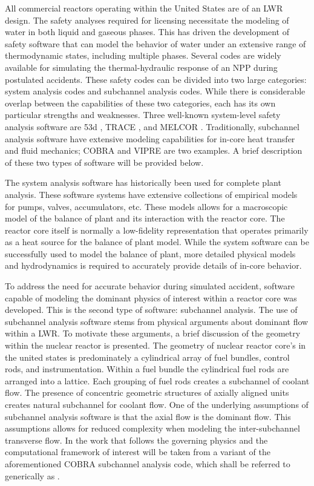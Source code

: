 All commercial reactors operating within the United States are of an LWR design.
The safety analyses required for licensing necessitate the modeling of water in both liquid and gaseous phases.
This has driven the development of safety software that can model the behavior of water under an extensive range of thermodynamic states, including multiple phases.
Several codes are widely available for simulating the thermal-hydraulic response of an NPP during postulated accidents.
These safety codes can be divided into two large categories: system analysis codes and subchannel analysis codes.
While there is considerable overlap between the capabilities of these two categories, each has its own particular strengths and weaknesses.
Three well-known system-level safety analysis software are \relap53d{} \cite{RELAP}, TRACE \cite{TRACE}, and MELCOR \cite{Summers1994}.
Traditionally, subchannel analysis software have extensive modeling capabilities for in-core heat transfer and fluid mechanics; COBRA \cite{Thurgood1983c} and VIPRE are two examples.
A brief description of these two types of software will be provided below.

The system analysis software has historically been used for complete plant analysis.
These software systems have extensive collections of empirical models for pumps, valves, accumulators, etc.
These models allows for a macroscopic model of the balance of plant and its interaction with the
reactor core.
The reactor core itself is normally a low-fidelity representation that operates primarily as a heat source for the balance of plant model.
While the system software can be successfully used to model the balance of plant, more detailed physical models and hydrodynamics is required to accurately provide details of in-core behavior.

To address the need for accurate behavior during simulated accident, software capable of modeling the dominant physics of interest within a reactor core was developed.
This is the second type of software: subchannel analysis.
The use of subchannel analysis software stems from physical arguments about dominant flow within a LWR.
To motivate these arguments, a brief discussion of the geometry within the nuclear reactor is presented.
The geometry of nuclear reactor core's in the united states is predominately a cylindrical array of fuel bundles, control rods, and instrumentation.
Within a fuel bundle the cylindrical fuel rods are arranged into a lattice.
Each grouping of fuel rods creates a subchannel of coolant flow.
The presence of concentric geometric structures of axially aligned units creates natural subchannel for coolant flow.
One of the underlying assumptions of subchannel analysis software is that the axial flow is the dominant flow.
This assumptions allows for reduced complexity when modeling the inter-subchannel transverse flow.
In the work that follows the governing physics and the computational framework of interest will be taken from a variant of the aforementioned COBRA subchannel analysis code, which shall be referred to generically as \cobra{}.

